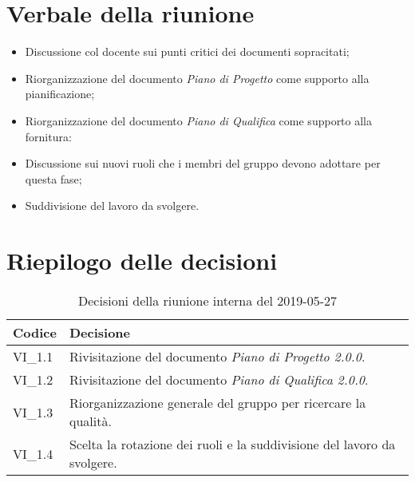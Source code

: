 \section{Verbale della riunione}
\begin{itemize}
	\item Discussione col docente sui punti critici dei documenti sopracitati;
	\item Riorganizzazione del documento \textit{Piano di Progetto} come supporto alla pianificazione;
	\item Riorganizzazione del documento \textit{Piano di Qualifica} come supporto alla fornitura:
	\item Discussione sui nuovi ruoli che i membri del gruppo devono adottare per questa fase;
	\item Suddivisione del lavoro da svolgere.

\end{itemize} 
\pagebreak
\section{Riepilogo delle decisioni}

	
	\begin{longtable}{ >{\centering}p{} >{}p{}}
		\caption{Decisioni della riunione interna del 2019-05-27}\\	
		\rowcolorhead
		\textbf{\color{white}Codice} 
		& \centering\textbf{\color{white}Decisione} 
		\tabularnewline 
		\endfirsthead
		VI\_1.1 & Rivisitazione del documento \textit{Piano di Progetto 2.0.0}.
		
		\tabularnewline 
		VI\_1.2 & Rivisitazione del documento \textit{Piano di Qualifica 2.0.0}.
		
		\tabularnewline 
		VI\_1.3 & Riorganizzazione generale del gruppo per ricercare la qualità.
		
		\tabularnewline 
		VI\_1.4 & Scelta la rotazione dei ruoli e la suddivisione del lavoro da svolgere.
	
	\end{longtable}
	




